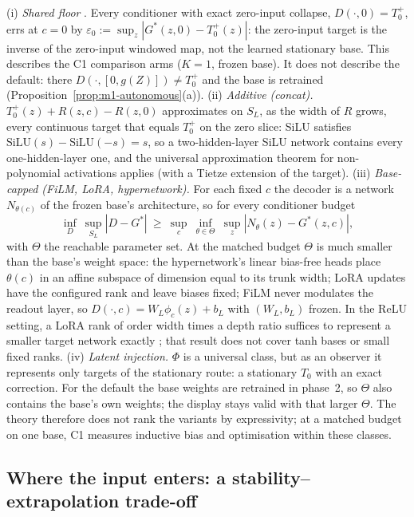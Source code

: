 \begin{remark}\label{rem:m1-capacity}
(i) \emph{Shared floor} . Every conditioner with exact zero-input collapse, $D(\cdot,0)=T_0^+$, errs at $c=0$ by
$\varepsilon_0:=\sup_z|G^*(z,0)-T_0^+(z)|$: the zero-input target is the inverse of the zero-input windowed map,
not the learned stationary base. This describes the C1 comparison arms ($K=1$, frozen base). It does not describe the
default: there $D(\cdot,[0,g(Z)])\ne T_0^+$ and the base is retrained (Proposition~\ref{prop:m1-autonomous}(a)). (ii) \emph{Additive (concat).} $T_0^+(z)+R(z,c)-R(z,0)$ approximates on $S_L$, as
the width of $R$ grows, every continuous target that equals $T_0^+$ on the zero slice: SiLU satisfies
$\mathrm{SiLU}(s)-\mathrm{SiLU}(-s)=s$, so a two-hidden-layer SiLU network contains every one-hidden-layer one, and
the universal approximation theorem for non-polynomial activations \citep{leshno1993multilayer} applies (with a
Tietze extension of the target). (iii) \emph{Base-capped (FiLM, LoRA, hypernetwork).} For each fixed $c$ the decoder
is a network $N_{\theta(c)}$ of the frozen base's architecture, so for every conditioner budget
\[
\inf_{D}\ \sup_{S_L}|D-G^*|\ \ge\ \sup_{c}\ \inf_{\theta\in\Theta}\ \sup_z|N_\theta(z)-G^*(z,c)|,
\]
with $\Theta$ the reachable parameter set. At the matched budget $\Theta$ is much smaller than the base's weight
space: the hypernetwork's linear bias-free heads place $\theta(c)$ in an affine subspace of dimension equal to its
trunk width; LoRA updates have the configured rank and leave biases fixed; FiLM never modulates the readout layer, so
$D(\cdot,c)=W_L\phi_c(z)+b_L$ with $(W_L,b_L)$ frozen. In the ReLU setting, a LoRA rank of order width times a depth
ratio suffices to represent a smaller target network exactly \citep{zeng2024expressive}; that result does not cover
tanh bases or small fixed ranks. (iv) \emph{Latent injection.} $\Phi$ is a universal class, but as an observer it
represents only targets of the stationary route: a stationary $T_0$ with an exact correction.
 For the default the base weights are retrained in phase~2, so $\Theta$ also contains the
base's own weights; the display stays valid with that larger $\Theta$. The theory therefore does not rank the variants by expressivity; at a matched budget on one base, C1 measures
inductive bias and optimisation within these classes.
\end{remark}

\subsection{Where the input enters: a stability--extrapolation trade-off}

